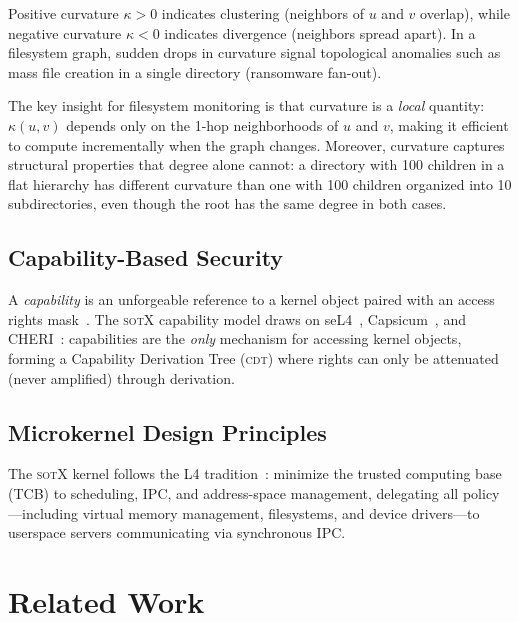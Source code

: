 \documentclass[11pt,a4paper]{article}
\theoremstyle{definition}
\theoremstyle{remark}
\newcommand{\sotx}{\textsc{sotX}}
\newcommand{\CDT}{\textsc{cdt}}
\newcommand{\OR}{\ensuremath{\kappa}}  %
\begin{document}
Positive curvature $\OR > 0$ indicates clustering (neighbors of $u$
and $v$ overlap), while negative curvature $\OR < 0$ indicates
divergence (neighbors spread apart). In a filesystem graph, sudden
drops in curvature signal topological anomalies such as mass file
creation in a single directory (ransomware fan-out).

The key insight for filesystem monitoring is that curvature is a
\emph{local} quantity: $\OR(u, v)$ depends only on the 1-hop
neighborhoods of $u$ and $v$, making it efficient to compute
incrementally when the graph changes. Moreover, curvature captures
structural properties that degree alone cannot: a directory with 100
children in a flat hierarchy has different curvature than one with 100
children organized into 10 subdirectories, even though the root has
the same degree in both cases.

\subsection{Capability-Based Security}
\label{sec:bg-caps}

A \emph{capability} is an unforgeable reference to a kernel object
paired with an access rights mask~\cite{dennis1966}. The
\sotx{} capability model draws on seL4~\cite{klein2009},
Capsicum~\cite{watson2010}, and CHERI~\cite{woodruff2014}: capabilities
are the \emph{only} mechanism for accessing kernel objects, forming a
Capability Derivation Tree (\CDT{}) where rights can only be
attenuated (never amplified) through derivation.

\subsection{Microkernel Design Principles}
\label{sec:bg-ukernel}

The \sotx{} kernel follows the L4 tradition~\cite{liedtke1993}:
minimize the trusted computing base (TCB) to scheduling, IPC, and
address-space management, delegating all policy---including virtual
memory management, filesystems, and device drivers---to userspace
servers communicating via synchronous IPC.

\section{Related Work}
\label{sec:related}
\end{document}
